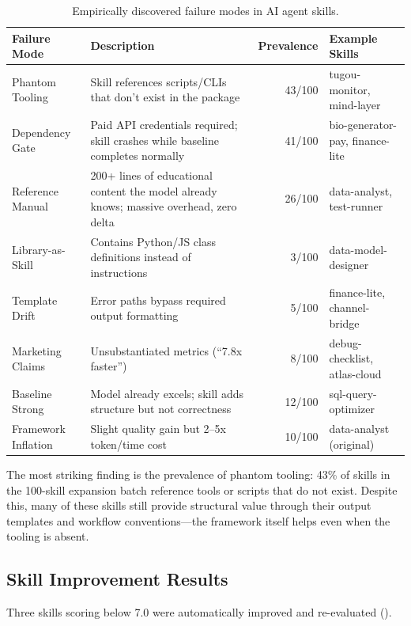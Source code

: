 \documentclass[11pt,a4paper]{article}
\begin{document}
\begin{table}[h]
\centering
\caption{Empirically discovered failure modes in AI agent skills.}
\label{tab:failures}
\begin{tabular}{p{3.2cm}p{5cm}rp{3cm}}
\toprule
\textbf{Failure Mode} & \textbf{Description} & \textbf{Prevalence} & \textbf{Example Skills} \\
\midrule
Phantom Tooling & Skill references scripts/CLIs that don't exist in the package & 43/100 & tugou-monitor, mind-layer \\
Dependency Gate & Paid API credentials required; skill crashes while baseline completes normally & 41/100 & bio-generator-pay, finance-lite \\
Reference Manual & 200+ lines of educational content the model already knows; massive overhead, zero delta & 26/100 & data-analyst, test-runner \\
Library-as-Skill & Contains Python/JS class definitions instead of instructions & 3/100 & data-model-designer \\
Template Drift & Error paths bypass required output formatting & 5/100 & finance-lite, channel-bridge \\
Marketing Claims & Unsubstantiated metrics (``7.8x faster'') & 8/100 & debug-checklist, atlas-cloud \\
Baseline Strong & Model already excels; skill adds structure but not correctness & 12/100 & sql-query-optimizer \\
Framework Inflation & Slight quality gain but 2--5x token/time cost & 10/100 & data-analyst (original) \\
\bottomrule
\end{tabular}
\end{table}

The most striking finding is the prevalence of phantom tooling: 43\% of skills in the 100-skill expansion batch reference tools or scripts that do not exist. Despite this, many of these skills still provide structural value through their output templates and workflow conventions---the framework itself helps even when the tooling is absent.

\subsection{Skill Improvement Results}

Three skills scoring below 7.0 were automatically improved and re-evaluated ().
\end{document}

